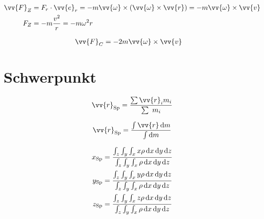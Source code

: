 \begin{boxleft}
\end{boxleft}\begin{boxrightshaded}
\begin{align}
\vv{F}_Z&=F_r\cdot \vv{e}_r=-m\vv{\omega}\times\left(\vv{\omega}\times\vv{r}\right)=-m\vv{\omega}\times\vv{v}\\
  F_Z&=-m\frac{v^2}{r}=-m\omega^2 r
\end{align}
\end{boxrightshaded}

\begin{boxleft}
\end{boxleft}\begin{boxrightshaded}
\begin{align}
\vv{F}_C&=-2m\vv{\omega}\times\vv{v}
\end{align}
\end{boxrightshaded}

\section{Schwerpunkt}

\begin{boxleft}
\end{boxleft}\begin{boxrightshaded}
\begin{align}
\vv{r}_{\text{Sp}}=\frac{\sum\vv{r}_i m_i}{\sum\ m_i}
\end{align}
\end{boxrightshaded}

\begin{boxleft}
\end{boxleft}\begin{boxrightshaded}
\begin{align}
\vv{r}_{\text{Sp}}=\frac{\int \vv{r}\diff m}{\int \diff m}
\end{align}
\end{boxrightshaded}

\begin{boxleft}
\end{boxleft}\begin{boxrightshaded}
\begin{align}
x_{\text{Sp}}&=\frac{\int_z\int_y\int_x x\rho \diff x \diff y \diff z }{\int_z\int_y\int_x \rho \diff x \diff y \diff z }\\
y_{\text{Sp}}&=\frac{\int_z\int_y\int_x y\rho \diff x \diff y \diff z }{\int_z\int_y\int_x \rho \diff x \diff y \diff z }\\
z_{\text{Sp}}&=\frac{\int_z\int_y\int_x z\rho \diff x \diff y \diff z }{\int_z\int_y\int_x \rho \diff x \diff y \diff z }
\end{align}
\end{boxrightshaded}


